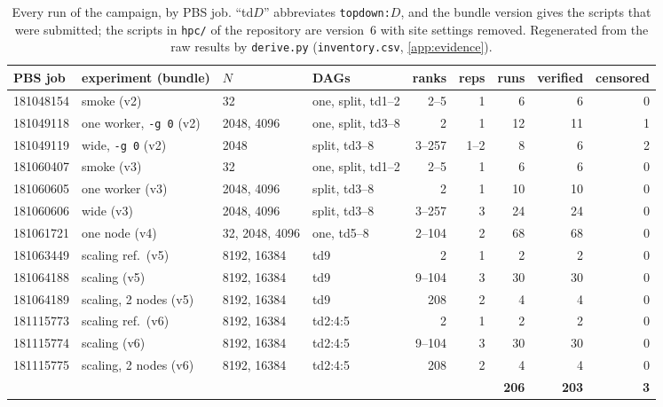 \documentclass[11pt,a4paper]{article}
\newcommand{\dfam}[1]{\texttt{#1}}
\newcommand{\opt}[1]{\texttt{#1}}
\begin{document}
\begin{table}[htbp]
\centering\small
\setlength{\tabcolsep}{3pt}
\begin{tabular}{@{}llllrrrrr@{}}
\toprule
PBS job & experiment (bundle) & $N$ & DAGs & ranks & reps & runs & verified & censored \\
\midrule
181048154 & smoke (v2) & 32 & one, split, td1--2 & 2--5 & 1 & 6 & 6 & 0 \\
181049118 & one worker, \opt{-g 0} (v2) & 2048, 4096 & one, split, td3--8 & 2 & 1 & 12 & 11 & 1 \\
181049119 & wide, \opt{-g 0} (v2) & 2048 & split, td3--8 & 3--257 & 1--2 & 8 & 6 & 2 \\
181060407 & smoke (v3) & 32 & one, split, td1--2 & 2--5 & 1 & 6 & 6 & 0 \\
181060605 & one worker (v3) & 2048, 4096 & split, td3--8 & 2 & 1 & 10 & 10 & 0 \\
181060606 & wide (v3) & 2048, 4096 & split, td3--8 & 3--257 & 3 & 24 & 24 & 0 \\
181061721 & one node (v4) & 32, 2048, 4096 & one, td5--8 & 2--104 & 2 & 68 & 68 & 0 \\
181063449 & scaling ref.\ (v5) & 8192, 16384 & td9 & 2 & 1 & 2 & 2 & 0 \\
181064188 & scaling (v5) & 8192, 16384 & td9 & 9--104 & 3 & 30 & 30 & 0 \\
181064189 & scaling, 2 nodes (v5) & 8192, 16384 & td9 & 208 & 2 & 4 & 4 & 0 \\
181115773 & scaling ref.\ (v6) & 8192, 16384 & td2:4:5 & 2 & 1 & 2 & 2 & 0 \\
181115774 & scaling (v6) & 8192, 16384 & td2:4:5 & 9--104 & 3 & 30 & 30 & 0 \\
181115775 & scaling, 2 nodes (v6) & 8192, 16384 & td2:4:5 & 208 & 2 & 4 & 4 & 0 \\
\midrule
& & & & & & \textbf{206} & \textbf{203} & \textbf{3} \\
\bottomrule
\end{tabular}
\caption{Every run of the campaign, by PBS job. ``td$D$'' abbreviates \dfam{topdown:$D$}, and the
bundle version gives the scripts that were submitted; the scripts in \texttt{hpc/} of the
repository are version~6 with site settings removed. Regenerated from the raw results by
\texttt{derive.py} (\texttt{inventory.csv}, \cref{app:evidence}).}
\label{tab:inventory}
\end{table}
\end{document}
